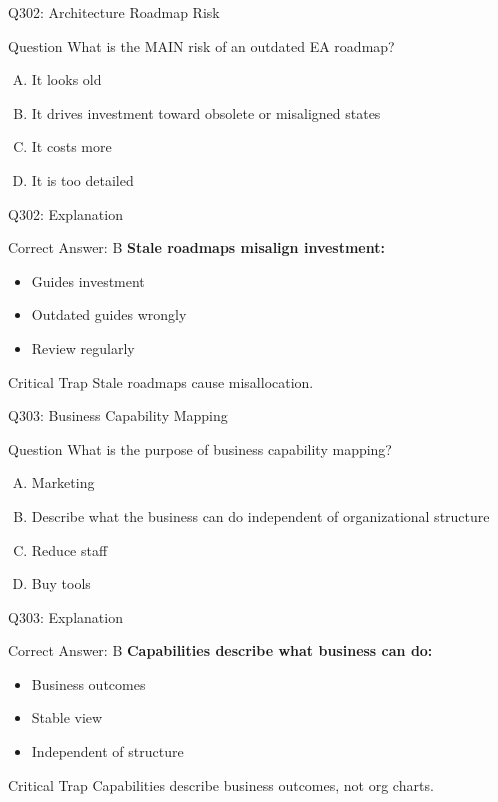 \documentclass{beamer}
\begin{document}
	\begin{frame}{Q302: Architecture Roadmap Risk}
		\begin{block}{Question}
			What is the MAIN risk of an outdated EA roadmap?
		\end{block}
		\begin{enumerate}[(A)]
			\item It looks old
			\item It drives investment toward obsolete or misaligned states
			\item It costs more
			\item It is too detailed
		\end{enumerate}
	\end{frame}
	
	\begin{frame}{Q302: Explanation}
		\begin{block}{Correct Answer: B}
			\textbf{Stale roadmaps misalign investment:}
			\begin{itemize}
				\item Guides investment
				\item Outdated guides wrongly
				\item Review regularly
			\end{itemize}
		\end{block}
		\begin{alertblock}{Critical Trap}
			Stale roadmaps cause misallocation.
		\end{alertblock}
	\end{frame}
	
	\begin{frame}{Q303: Business Capability Mapping}
		\begin{block}{Question}
			What is the purpose of business capability mapping?
		\end{block}
		\begin{enumerate}[(A)]
			\item Marketing
			\item Describe what the business can do independent of organizational structure
			\item Reduce staff
			\item Buy tools
		\end{enumerate}
	\end{frame}
	
	\begin{frame}{Q303: Explanation}
		\begin{block}{Correct Answer: B}
			\textbf{Capabilities describe what business can do:}
			\begin{itemize}
				\item Business outcomes
				\item Stable view
				\item Independent of structure
			\end{itemize}
		\end{block}
		\begin{alertblock}{Critical Trap}
			Capabilities describe business outcomes, not org charts.
		\end{alertblock}
	\end{frame}
	
\end{document}
